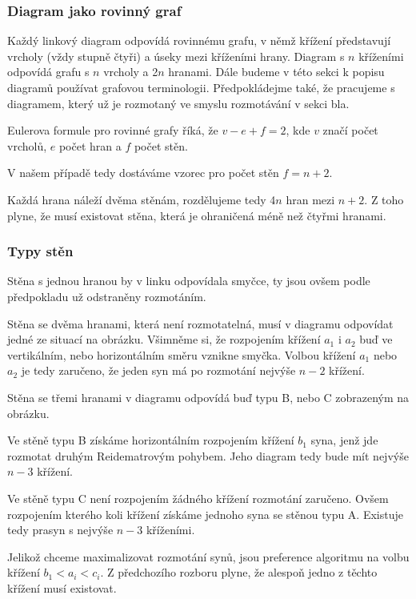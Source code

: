 \subsubsection{Diagram jako rovinný graf}
Každý linkový diagram odpovídá rovinnému grafu, v němž křížení představují vrcholy (vždy stupně čtyři) a úseky mezi kříženími hrany. Diagram s $n$ kříženími odpovídá grafu s $n$ vrcholy a 2$n$ hranami.
Dále budeme v této sekci k popisu diagramů používat grafovou terminologii. Předpokládejme také, že pracujeme s diagramem, který už je rozmotaný ve smyslu rozmotávání v sekci bla.

Eulerova formule pro rovinné grafy říká, že $v - e +f = 2$, kde $v$ značí počet vrcholů, $e$ počet hran a $f$ počet stěn.

V našem případě tedy dostáváme vzorec pro počet stěn $f = n+2$.

Každá hrana náleží dvěma stěnám, rozdělujeme tedy 4$n$ hran mezi $n+2$. Z toho plyne, že musí existovat stěna, která je ohraničená méně než čtyřmi hranami.

\subsubsection{Typy stěn}

Stěna s jednou hranou by v linku odpovídala smyčce, ty jsou ovšem podle předpokladu už odstraněny rozmotáním.

Stěna se dvěma hranami, která není rozmotatelná, musí v diagramu odpovídat jedné ze situací na obrázku. Všimněme si, že rozpojením křížení $a_1$ i $a_2$ buď ve vertikálním, nebo horizontálním směru vznikne smyčka. Volbou křížení $a_1$ nebo $a_2$ je tedy zaručeno, že jeden syn má po rozmotání nejvýše $n-2$ křížení.

Stěna se třemi hranami v diagramu odpovídá buď typu B, nebo C zobrazeným na obrázku.

Ve stěně typu B získáme horizontálním rozpojením křížení $b_1$ syna, jenž jde rozmotat druhým Reidematrovým pohybem. Jeho diagram tedy bude mít nejvýše $n-3$ křížení.

Ve stěně typu C není rozpojením žádného křížení rozmotání zaručeno. Ovšem rozpojením kterého koli křížení získáme jednoho syna se stěnou typu A. Existuje tedy prasyn s nejvýše $n-3$ kříženími.

Jelikož chceme maximalizovat rozmotání synů, jsou preference algoritmu na volbu křížení $b_1 < a_i  < c_i$. Z předchozího rozboru plyne, že alespoň jedno z těchto křížení musí existovat.

